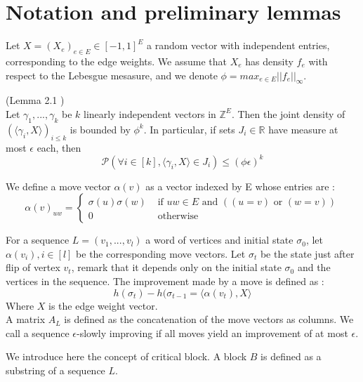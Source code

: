 \section{Notation and preliminary lemmas}

Let $X = (X_e)_{e \in E} \in [-1, 1]^E$ a random vector with independent entries, corresponding to the edge weights. We assume that $X_e$ has density $f_e$ with respect to the Lebesgue mesasure, and we denote $\phi = max_{e \in E}||f_e||_\infty$. 

\begin{lemma} (Lemma 2.1 \cite{angel2016local})\\
\label{noise}
Let $\gamma_1, ..., \gamma_k$ be $k$ linearly independent vectors in $\mathbb{Z}^E$. Then the joint density of$ (\langle \gamma_i, X \rangle)_{i \leq k}$ is bounded by $\phi^k$. In particular, if sets $J_i \in \mathbb R$ have measure at most $\epsilon$ each, then 
\begin{equation*}
\mathcal{P} (\forall i \in [k], \langle \gamma_i, X \rangle \in J_i) \leq (\phi \epsilon)^k
\end{equation*}
\end{lemma}

We define a move vector $\alpha(v)$ as a vector indexed by E whose entries are :
\begin{equation*}
\alpha(v)_{uw} = 
\begin{cases}
\sigma(u)\sigma(w) &\text{ if } uw \in E \text{ and }( (u = v) \text{ or } (w = v)) \\
 0 &\text{ otherwise}
 \end{cases}
\end{equation*} 

For a sequence $L = (v_1, ..., v_l)$ a word of vertices and initial state $\sigma_0$, let $\alpha(v_i), i \in [l]$ be the corresponding move vectors. Let $\sigma_t$ be the state just after flip of vertex $v_t$, remark that it depends only on the initial state $\sigma_0$ and the vertices in the sequence.
The improvement made by a move is defined as :
\begin{equation*}
h(\sigma_t) - h(\sigma_{t-1} = \langle \alpha(v_t), X \rangle
\end{equation*}
Where $X$ is the edge weight vector.\\ 
A matrix $A_L$ is defined as the concatenation of the move vectors as columns. We call a sequence $\epsilon$-slowly improving if all moves yield an improvement of at most $\epsilon$.

We introduce here the concept of critical block. A block $B$ is defined as a substring of a sequence $L$.

